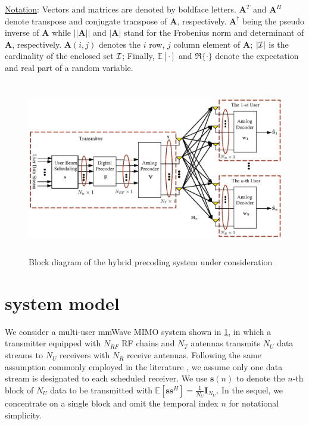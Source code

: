 \documentclass[conference]{IEEEtran}
\begin{document}
\underline{Notation}: Vectors and matrices are denoted by boldface letters. ${\bm A}^T$ and ${\bm A}^H$ denote transpose and conjugate transpose of ${\bm A}$, respectively. $\bm{A}^\dagger$ being the pseudo inverse of $\bm{A}$ while $||\bm{A}|| $ and $|\bm{A}|$ stand for the Frobenius norm and determinant of ${\bm A}$, respectively. $\bm{A}(i,j)$ denotes the $i$ row, $j$ column element of ${\bm A}$; $|\cal{I}|$ is the cardinality of the enclosed set ${\cal I}$; Finally, $\mathbb{E}[\cdot] $ and $\Re\{\cdot\}$ denote the expectation and real part of a random variable.

\begin{figure}[htpb]
	\centering
	\begin{minipage}[t]{0.7\linewidth}
		\includegraphics[width=5.6in,height=3in]{PPTFigure/BlockDiagonal.eps}
		\caption{Block diagram of the hybrid precoding system under consideration}\label{fig:BlockDiagram}
		\parbox{6.5cm}{\small \hspace{1.5cm} }
	\end{minipage}
\end{figure}

\section{system model}
We consider a multi-user mmWave MIMO system shown in \figurename{ \ref{fig:BlockDiagram}}, in which a transmitter equipped with $N_{RF}$ RF chains and $N_T$ antennas transmits $N_U$ data streams to $N_U$ receivers with $N_R$ receive antennas. Following the same assumption commonly employed in the literature \cite{alkhateeb2015limited}, we assume only one data stream is designated to each scheduled receiver. We use ${\bm s}(n)$ to denote the $n$-th block of $N_U$ data to be transmitted with $\mathbb{E}\left[\bm{ss}^H\right]=\frac{1}{N_U}\bm{I}_{N_U}$. In the sequel, we concentrate on a single block and omit the temporal index $n$ for notational simplicity.
\end{document}
